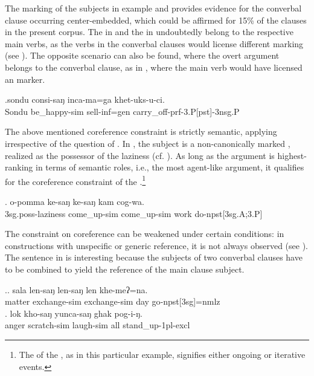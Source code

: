 The  marking of the subjects in example \Last[a] and \Last[c] provides evidence for the converbal clause occurring center-embedded, which could be affirmed for 15\% of the  clauses in the present corpus. The   in \Last[a] and the   in  \Last[c] undoubtedly belong to the respective  main verbs, as the verbs in the converbal clauses would license different  marking (see ). The opposite scenario can also be found, where the overt argument belongs to the converbal clause, as in  \Next, where the main verb would have licensed an   marker.  

\exg.sondu  consi-saŋ  inca-ma=ga    khet-uks-u-ci.\\
Sondu   be\_happy{\sc -sim} sell{\sc -inf=gen} carry\_off{\sc -prf-3.P[pst]-3nsg.P}\\
 


The above mentioned coreference constraint is strictly semantic, applying irrespective of the question of . In \Next, the subject is a non-canonically marked , realized as the possessor of the laziness (cf. ). As long as the argument is highest-ranking in terms of semantic roles, i.e., the  most agent-like argument, it qualifies for the coreference constraint of the .\footnote{The  of the , as in this particular example, signifies either ongoing or iterative events.}

\exg.	o-pomma ke-saŋ ke-saŋ kam cog-wa.\\
	{\sc 3sg.poss-}laziness come\_up-{\sc sim} come\_up-{\sc sim} work do{\sc -npst[3sg.A;3.P]}\\
		
The constraint on coreference can be weakened under certain conditions: in constructions with unspecific or generic reference, it is not always observed (see \Next[a]). The sentence in \Next[b] is interesting because the subjects of two converbal clauses have to be combined to yield the reference of the main clause subject. 

\ex.\ag.	sala len-saŋ len-saŋ len khe-meʔ=na.\\
		matter exchange-{\sc sim} exchange-{\sc sim} day   go{\sc -npst[3sg]=nmlz}\\
		\bg.  lok kho-saŋ                 yunca-saŋ              ghak pog-i-ŋ.\\
		anger scratch{\sc -sim} laugh{\sc -sim} all stand\_up{\sc -1pl-excl}\\
		 
		
